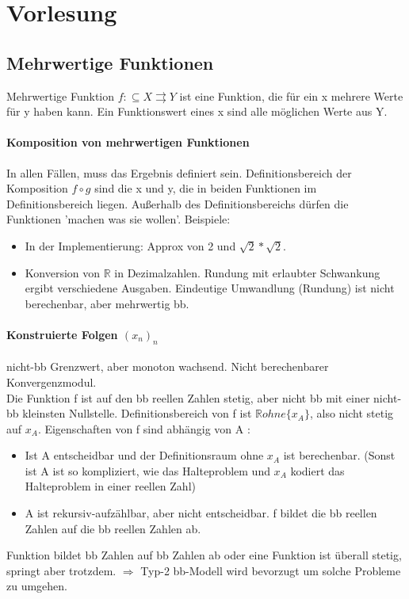 \documentclass[ngerman]{scrartcl}
\begin{document}
\section{Vorlesung}
\subsection{Mehrwertige Funktionen}
Mehrwertige Funktion $ f: \subseteq X \rightrightarrows  Y $ ist eine Funktion, die für ein x mehrere Werte für y haben kann. Ein Funktionswert eines x sind alle möglichen Werte aus Y.

\paragraph{Komposition von mehrwertigen Funktionen} In allen Fällen, muss das Ergebnis definiert sein. Definitionsbereich  der Komposition $ f \circ g $ sind die x und y, die in beiden Funktionen im Definitionsbereich liegen. Außerhalb des Definitionsbereichs dürfen die Funktionen 'machen was sie wollen'. Beispiele:
\begin{itemize}
  \item In der Implementierung: Approx von 2 und $ \sqrt{2} * \sqrt{2} $.
  \item Konversion von $ \mathbb{R} $ in Dezimalzahlen. Rundung mit erlaubter Schwankung ergibt verschiedene Ausgaben. Eindeutige Umwandlung (Rundung) ist nicht berechenbar, aber mehrwertig bb.
\end{itemize}

\paragraph{Konstruierte Folgen $ (x_n)_n $} nicht-bb Grenzwert, aber monoton wachsend. Nicht berechenbarer Konvergenzmodul. \\
Die Funktion f ist auf den bb reellen Zahlen stetig, aber nicht bb mit einer nicht-bb kleinsten Nullstelle. Definitionsbereich von f ist $ \mathbb{R} ohne \{x_A \} $, also nicht stetig auf $ x_A $. Eigenschaften von f sind abhängig von A :
\begin{itemize}
  \item Ist A entscheidbar und der Definitionsraum ohne $ x_A $ ist berechenbar. (Sonst ist A ist so kompliziert, wie das Halteproblem und $ x_A $ kodiert das Halteproblem in einer reellen Zahl)
  \item A ist rekursiv-aufzählbar, aber nicht entscheidbar. f bildet die bb reellen Zahlen auf die bb reellen Zahlen ab.
\end{itemize}
Funktion bildet bb Zahlen auf bb Zahlen ab oder eine Funktion ist überall stetig, springt aber trotzdem. $ \Rightarrow $ Typ-2 bb-Modell wird bevorzugt um solche Probleme zu umgehen.
\end{document}
